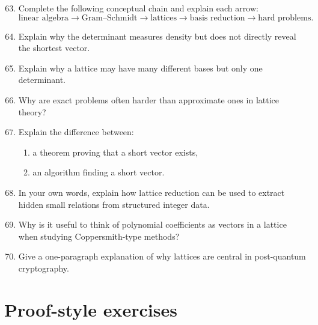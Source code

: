 \documentclass[11pt]{article}
\begin{document}
\begin{enumerate}
	\setcounter{enumi}{62}
	\item Complete the following conceptual chain and explain each arrow:
	\[
	\text{linear algebra}
	\longrightarrow
	\text{Gram--Schmidt}
	\longrightarrow
	\text{lattices}
	\longrightarrow
	\text{basis reduction}
	\longrightarrow
	\text{hard problems}.
	\]
	
	\item Explain why the determinant measures density but does not directly reveal the shortest vector.
	
	\item Explain why a lattice may have many different bases but only one determinant.
	
	\item Why are exact problems often harder than approximate ones in lattice theory?
	
	\item Explain the difference between:
	\begin{enumerate}
		\item a theorem proving that a short vector exists,
		\item an algorithm finding a short vector.
	\end{enumerate}
	
	\item In your own words, explain how lattice reduction can be used to extract hidden small relations from structured integer data.
	
	\item Why is it useful to think of polynomial coefficients as vectors in a lattice when studying Coppersmith-type methods?
	
	\item Give a one-paragraph explanation of why lattices are central in post-quantum cryptography.
\end{enumerate}

\section{Proof-style exercises}
\end{document}
